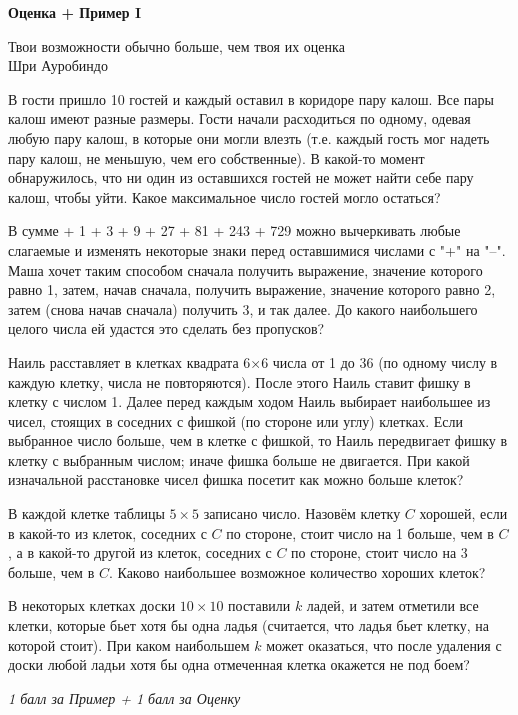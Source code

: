 \centerline{\bf \Huge Оценка + Пример I}

\begin{flushright}
        \scriptsize{Твои возможности обычно больше, чем твоя их оценка\\ Шри Ауробиндо}
\end{flushright}
 В гости пришло 10 гостей и каждый оставил в коридоре пару калош. Все пары калош имеют разные размеры. Гости начали расходиться по одному, одевая любую пару калош, в которые они могли влезть (т.е. каждый гость мог надеть пару калош, не меньшую, чем его собственные). В какой-то момент обнаружилось, что ни один из оставшихся гостей не может найти себе пару калош, чтобы уйти. Какое максимальное число гостей могло остаться?

 В сумме  + 1 + 3 + 9 + 27 + 81 + 243 + 729  можно вычеркивать любые слагаемые и изменять некоторые знаки перед оставшимися числами с "+" на "–". Маша хочет таким способом сначала получить выражение, значение которого равно 1, затем, начав сначала, получить выражение, значение которого равно 2, затем (снова начав сначала) получить 3, и так далее. До какого наибольшего целого числа ей удастся это сделать без пропусков?


 Наиль расставляет в клетках квадрата 6×6 числа от 1 до 36 (по одному числу в каждую клетку, числа не повторяются). После этого Наиль ставит фишку в клетку с числом 1. Далее перед каждым ходом Наиль выбирает наибольшее из чисел, стоящих в соседних с фишкой (по стороне или углу) клетках. Если выбранное число больше, чем в клетке с фишкой, то Наиль передвигает фишку в клетку с выбранным числом; иначе фишка больше не двигается. При какой изначальной расстановке чисел фишка посетит как можно больше клеток?

 В каждой клетке таблицы $5\times5$ записано число. Назовём клетку $C$ хорошей, если в какой-то из клеток, соседних с $C$ по стороне, стоит число на 1 больше, чем в $C$, а в какой-то другой из клеток, соседних с $C$ по стороне, стоит число на 3 больше, чем в $C$. Каково наибольшее возможное количество хороших клеток?


 В некоторых клетках доски  $10\times10$ поставили $k$  ладей, и затем отметили все клетки, которые бьет хотя бы одна ладья (считается, что ладья бьет клетку, на которой стоит). При каком наибольшем  $k$ может оказаться, что после удаления с доски любой ладьи хотя бы одна отмеченная клетка окажется не под боем?


\centerline{\textit{1 балл за Пример + 1 балл за Оценку}}\\

